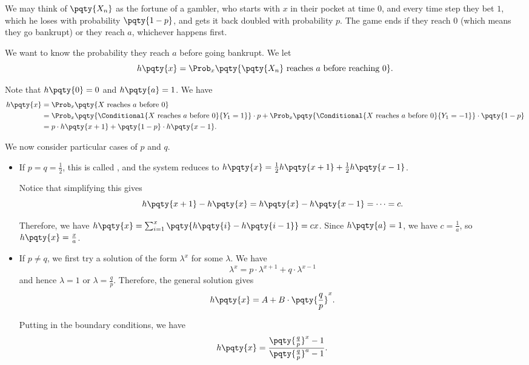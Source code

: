\begin{example}
    \label{ex:gambler-ruin-estimates}%
    We may think of \(\pqty{X_n}\) as the fortune of a gambler, who starts with \(x\) in their pocket at time \(0\), and every time step they bet \(1\), which he loses with probability \(\pqty{1 - p}\), and gets it back doubled with probability \(p\). The game ends if they reach \(0\) (which means they go bankrupt) or they reach \(a\), whichever happens first.

    We want to know the probability they reach \(a\) before going bankrupt. We let
    \[
        h\pqty{x} = \Prob_x \pqty{\pqty{X_n} \text{ reaches }a\text{ before reaching }0}.
    \]

    Note that \(h\pqty{0} = 0\) and \(h\pqty{a} = 1\). We have
    \begin{align*}
        h\pqty{x} &= \Prob_x \pqty{X \text{ reaches }a\text{ before }0} \\
        &= \Prob_x \pqty{\Conditional{X \text{ reaches }a\text{ before }0}{Y_1 = 1}} \cdot p + \Prob_x \pqty{\Conditional{X \text{ reaches }a\text{ before }0}{Y_1 = -1}} \cdot \pqty{1 - p} \\
        &= p \cdot h \pqty{x + 1} + \pqty{1 - p} \cdot h \pqty{x - 1}.
    \end{align*}

    We now consider particular cases of \(p\) and \(q\).

    \begin{itemize}
        \item If \(p = q = \frac{1}{2}\), this is called , and the system reduces to \(h\pqty{x} = \frac{1}{2} h \pqty{x + 1} + \frac{1}{2} h \pqty{x - 1}\).
        
        Notice that simplifying this gives
        \[
            h\pqty{x + 1} - h\pqty{x} = h\pqty{x} - h\pqty{x - 1} = \cdots = c.
        \]

        Therefore, we have \(h\pqty{x} = \sum_{i = 1}^{x} \pqty{h\pqty{i} - h\pqty{i - 1}} = cx\). Since \(h\pqty{a} = 1\), we have \(c = \frac{1}{a}\), so \(h\pqty{x} = \frac{x}{a}\).

        \item If \(p \neq q\), we first try a solution of the form \(\lambda^x\) for some \(\lambda\). We have
        \[
            \lambda^x = p \cdot \lambda^{x + 1} + q \cdot \lambda^{x - 1}
        \]
        and hence \(\lambda = 1\) or \(\lambda = \frac{q}{p}\). Therefore, the general solution gives
        \[
            h\pqty{x} = A + B \cdot \pqty{\frac{q}{p}}^x.
        \]

        Putting in the boundary conditions, we have
        \[
            h\pqty{x} = \frac{\pqty{\frac{q}{p}}^x - 1}{\pqty{\frac{q}{p}}^a - 1}.
        \]
    \end{itemize}
\end{example}

